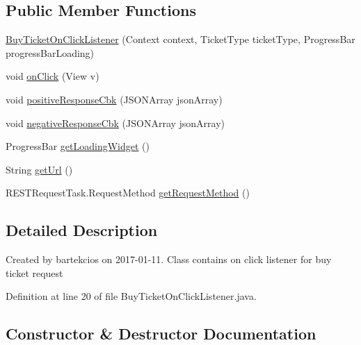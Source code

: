 \subsection*{Public Member Functions}
\begin{DoxyCompactItemize}
\item 
\hyperlink{classcom_1_1bartekcios_1_1ticketsclient_1_1_buy_ticket_on_click_listener_a91f80523da31a34e5ea5fb462742e87a}{Buy\+Ticket\+On\+Click\+Listener} (Context context, Ticket\+Type ticket\+Type, Progress\+Bar progress\+Bar\+Loading)
\item 
void \hyperlink{classcom_1_1bartekcios_1_1ticketsclient_1_1_buy_ticket_on_click_listener_aed28cec1a535a3600a1ef49e3c4d5f0e}{on\+Click} (View v)
\item 
void \hyperlink{classcom_1_1bartekcios_1_1ticketsclient_1_1_buy_ticket_on_click_listener_a1beb64e34d22d664b04d15d6f88e70d2}{positive\+Response\+Cbk} (J\+S\+O\+N\+Array json\+Array)
\item 
void \hyperlink{classcom_1_1bartekcios_1_1ticketsclient_1_1_buy_ticket_on_click_listener_a9b06a37be974fcbc0a1066ee86961775}{negative\+Response\+Cbk} (J\+S\+O\+N\+Array json\+Array)
\item 
Progress\+Bar \hyperlink{classcom_1_1bartekcios_1_1ticketsclient_1_1_buy_ticket_on_click_listener_a6b4d6ca6de0708fe070bf91b4f9424c1}{get\+Loading\+Widget} ()
\item 
String \hyperlink{classcom_1_1bartekcios_1_1ticketsclient_1_1_buy_ticket_on_click_listener_a194710d8152375b3340ae8382c31cb37}{get\+Url} ()
\item 
R\+E\+S\+T\+Request\+Task.\+Request\+Method \hyperlink{classcom_1_1bartekcios_1_1ticketsclient_1_1_buy_ticket_on_click_listener_ad5c606967a8c4a31e1c6cbfd0244b551}{get\+Request\+Method} ()
\end{DoxyCompactItemize}


\subsection{Detailed Description}
Created by bartekcios on 2017-\/01-\/11. Class contains on click listener for buy ticket request 

Definition at line 20 of file Buy\+Ticket\+On\+Click\+Listener.\+java.



\subsection{Constructor \& Destructor Documentation}
\mbox{\label{classcom_1_1bartekcios_1_1ticketsclient_1_1_buy_ticket_on_click_listener_a91f80523da31a34e5ea5fb462742e87a}} 
